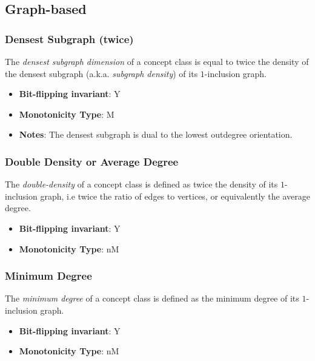 \subsection{Graph-based}\label{sec:Graph-based}
\subsubsection{Densest Subgraph (twice)}
      
      \begin{definition}\label{def:densest_subgraph_(twice)}
      The \emph{densest subgraph dimension} of a concept class is equal to twice the density of the densest subgraph (a.k.a. \emph{subgraph density}) of its $1$-inclusion graph.
      \end{definition}
      \begin{itemize}
      \item {\bf Bit-flipping invariant}: Y
      \item {\bf Monotonicity Type}: M
      \item {\bf Notes}: The densest subgraph is dual to the lowest outdegree orientation.
\end{itemize}
\subsubsection{Double Density or Average Degree}
      
      \begin{definition}\label{def:double_density_or_average_degree}
      The \emph{double-density} of a concept class is defined as twice the density of its $1$-inclusion graph, i.e twice the ratio of edges to vertices, or equivalently the average degree.
      \end{definition}
      \begin{itemize}
      \item {\bf Bit-flipping invariant}: Y
      \item {\bf Monotonicity Type}: nM
      \end{itemize}
\subsubsection{Minimum Degree}
      
      \begin{definition}\label{def:minimum_degree}
      The \emph{minimum degree} of a concept class is defined as the minimum degree of its $1$-inclusion graph.
      \end{definition}
      \begin{itemize}
      \item {\bf Bit-flipping invariant}: Y
      \item {\bf Monotonicity Type}: nM
      \end{itemize}
